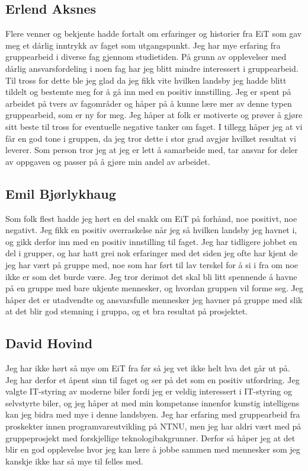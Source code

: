 \subsection*{Erlend Aksnes} Flere venner og bekjente hadde fortalt om erfaringer og historier fra EiT som gav meg et dårlig inntrykk av faget som utgangspunkt. 
Jeg har mye erfaring fra gruppearbeid i diverse fag gjennom studietiden.
 På grunn av opplevelser med dårlig ansvarsfordeling i noen fag har jeg blitt mindre interessert i gruppearbeid. 
Til tross for dette ble jeg glad da jeg fikk vite hvilken landsby jeg hadde blitt tildelt og bestemte meg for å gå inn med en positiv innstilling.
Jeg er spent på arbeidet på tvers av fagområder og håper på å kunne lære mer av denne typen gruppearbeid, som er ny for meg.  
Jeg håper at folk er motiverte og prøver å gjøre sitt beste til tross for eventuelle negative tanker om faget. 
I tillegg håper jeg at vi får en god tone i gruppen, da jeg tror dette i stor grad avgjør hvilket resultat vi leverer. 
Som person tror jeg at jeg er lett å samarbeide med, tar ansvar for deler av oppgaven og passer på å gjøre min andel av arbeidet. 

\subsection*{Emil Bjørlykhaug}
Som folk flest hadde jeg hørt en del snakk om EiT på forhånd, noe positivt, noe negativt. 
Jeg fikk en positiv overraskelse når jeg så hvilken landsby jeg havnet i, og gikk derfor 
inn med en positiv innstilling til faget. Jeg har tidligere jobbet en del i grupper, og har 
hatt grei nok erfaringer med det siden jeg ofte har kjent de jeg har vært på gruppe med, 
noe som har ført til lav terskel for å si i fra om noe ikke er som det burde være. 
Jeg tror derimot det skal bli litt spennende å havne på en gruppe med bare ukjente mennesker, 
og hvordan gruppen vil forme seg. Jeg håper det er utadvendte og ansvarsfulle mennesker jeg 
havner på gruppe med slik at det blir god stemning i gruppa, og et bra resultat på prosjektet.

\subsection*{David Hovind} Jeg har ikke hørt så mye om EiT fra før så jeg vet ikke helt hva det går ut på. 
Jeg har derfor et åpent sinn til faget og ser på det som en positiv utfordring. Jeg valgte IT-styring av moderne
biler fordi jeg er veldig interessert i IT-styring og selvstyrte biler, og jeg håper at med min kompetanse innenfor 
kunstig intelligens kan jeg bidra med mye i denne landsbyen. Jeg har erfaring med gruppearbeid fra proskekter 
innen programvareutvikling på NTNU, men jeg har aldri vært med på gruppeprosjekt med forskjellige teknologibakgrunner.
Derfor så håper jeg at det blir en god opplevelse hvor jeg kan lære å jobbe sammen med mennesker som jeg kanskje ikke
har så mye til felles med.

